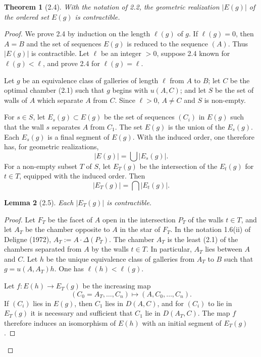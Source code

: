 \documentclass[11pt]{article}
\newtheorem{theorem}{Theorem}[section]
\newtheorem{lemma}[theorem]{Lemma}
\begin{document}
\begin{theorem}[2.4]
With the notation of 2.2, the geometric realization $|E(g)|$ of the ordered set $E(g)$ is contractible.
\end{theorem}
\begin{proof}
We prove 2.4 by induction on the length $\ell(g)$ of $g$. If $\ell(g)=0$, then $A=B$ and the set of sequences $E(g)$ is reduced to the sequence $(A)$. Thus $|E(g)|$ is contractible. Let $\ell$ be an integer $>0$, suppose 2.4 known for $\ell(g)<\ell$, and prove 2.4 for $\ell(g)=\ell$.

Let $g$ be an equivalence class of galleries of length $\ell$ from $A$ to $B$; let $C$ be the optimal chamber (2.1) such that $g$ begins with $u(A,C)$; and let $S$ be the set of walls of $A$ which separate $A$ from $C$. Since $\ell>0$, $A\ne C$ and $S$ is non-empty.

For $s\in S$, let $E_s(g)\subset E(g)$ be the set of sequences $(C_i)$ in $E(g)$ such that the wall $s$ separates $A$ from $C_1$. The set $E(g)$ is the union of the $E_s(g)$. Each $E_s(g)$ is a final segment of $E(g)$. With the induced order, one therefore has, for geometric realizations,
\begin{equation}
 |E(g)|=\bigcup |E_s(g)|.
\tag{2.4.1}
\end{equation}
For a non-empty subset $T$ of $S$, let $E_T(g)$ be the intersection of the $E_t(g)$ for $t\in T$, equipped with the induced order. Then
\begin{equation}
 |E_T(g)|=\bigcap |E_t(g)|.
\tag{2.4.2}
\end{equation}

\begin{lemma}[2.5]
Each $|E_T(g)|$ is contractible.
\end{lemma}
\begin{proof}
Let $F_T$ be the facet of $A$ open in the intersection $P_T$ of the walls $t\in T$, and let $A_T$ be the chamber opposite to $A$ in the star of $F_T$. In the notation 1.6(ii) of Deligne (1972), $A_T:=A\cdot\Delta(P_T)$. The chamber $A_T$ is the least (2.1) of the chambers separated from $A$ by the walls $t\in T$. In particular, $A_T$ lies between $A$ and $C$. Let $h$ be the unique equivalence class of galleries from $A_T$ to $B$ such that $g=u(A,A_T)h$. One has $\ell(h)<\ell(g)$.

Let $f:E(h)\to E_T(g)$ be the increasing map
\begin{equation}
 (C_0=A_T,\ldots,C_n)\longmapsto(A,C_0,\ldots,C_n).
\tag{2.5.1}
\end{equation}
If $(C_i)$ lies in $E(g)$, then $C_1$ lies in $D(A,C)$, and for $(C_i)$ to lie in $E_T(g)$ it is necessary and sufficient that $C_1$ lie in $D(A_T,C)$. The map $f$ therefore induces an isomorphism of $E(h)$ with an initial segment of $E_T(g)$.


\end{proof}
\end{proof}
\end{document}
